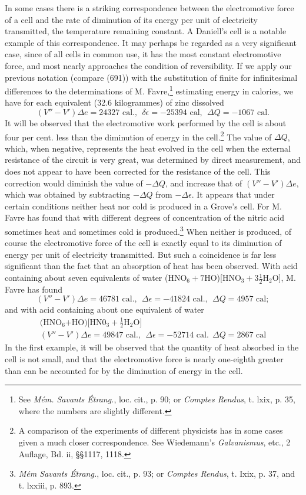 \documentclass[12pt]{memoir}
\begin{document}
In some cases there is a striking correspondence between the electromotive force of a cell and the rate of diminution of its energy per unit of electricity transmitted, the temperature remaining constant. A Daniell's cell is a notable example of this correspondence. It may perhaps be regarded as a very significant case, since of all cells in common use, it has the most constant electromotive force, and most nearly approaches the condition of reversibility. If we apply our previous notation (compare (691)) with the substitution of finite for infinitesimal differences to the determinations of M. Favre,\footnote{See \textit{M\'{e}m. Savants \'{E}trang.}, loc. cit., p. 90; or \textit{Comptes Rendus}, t. lxix, p. 35, where the numbers are slightly different.} estimating energy in calories, we have for each equivalent (32.6 kilogrammes) of zinc dissolved
$$(V''- V') \Delta e= 24327 \text{ cal}., \ \  \delta \epsilon = - 25394\text{ cal}, \ \  \Delta Q= - 1067 \text{ cal}.$$
It will be observed that the electromotive work performed by the cell is about four per cent. less than the diminution of energy in the cell.\footnote{A comparison of the experiments of different physicists has in some cases given a much closer correspondence. See Wiedemann's \textit{Galvanismus}, etc., 2 Auflage, Bd. ii, \S\S 1117, 1118.} The value of $\Delta Q$, which, when negative, represents the heat evolved in the cell when the external resistance of the circuit is very great, was determined by direct measurement, and does not appear to have been corrected for the resistance of the cell. This correction would diminish the value of $-\Delta Q$, and increase that of $(V'' - V')\Delta e$, which was obtained by subtracting $-\Delta Q$ from $- \Delta \epsilon$.
It appears that under certain conditions neither heat nor cold is produced in a Grove's cell. For M. Favre has found that with different degrees of concentration of the nitric acid sometimes heat and sometimes cold is produced.\footnote{\textit{M\'{e}m Savants \'{E}trang.}, loc. cit., p. 93; or \textit{Comptes Rendus}, t. Ixix, p. 37, and t. lxxiii, p. 893.} When neither is produced, of course the electromotive force of the cell is exactly equal to its diminution of energy per unit of electricity transmitted. But such a coincidence is far less significant than the fact that an absorption of heat has been observed. With acid containing about seven equivalents of water (HNO$_6+7$HO)[HNO$_3+3\tfrac{1}{2}$H$_2$O], M. Favre has found
$$ (V''- V')\Delta e=46781 \text{ cal.},\ \  \Delta \epsilon=  -41824 \text{ cal.}, \ \ \Delta Q=4957\text{ cal};$$
and with acid containing about one equivalent of water
\begin{gather*}\text{(HNO$_6$+HO)[HN0$_3+\tfrac{1}{2}$H$_2$O]}\\
(V''- V')\Delta e=49847 \text{ cal.},\ \  \Delta \epsilon=  -52714 \text{ cal.} \ \ \Delta Q=2867\text{ cal} \end{gather*}
In the first example, it will be observed that the quantity of heat absorbed in the cell is not small, and that the electromotive force is nearly one-eighth greater than can be accounted for by the diminution of energy in the cell.
\end{document}
